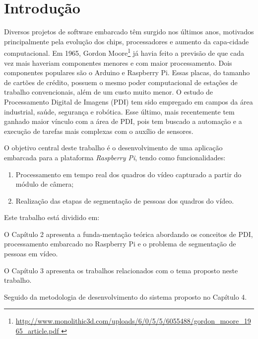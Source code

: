 \documentclass[12pt,oneside,a4paper,chapter=TITLE,section=TITLE,sumario=tradicional]{abntex2}
\begin{document}
\chapter{Introdução}
\label{cap:introducao}

Diversos projetos de software embarcado têm surgido nos últimos anos, motivados principalmente pela evolução dos chips, processadores e aumento da capa-cidade computacional. Em 1965, Gordon Moore\footnote{\url{ http://www.monolithic3d.com/uploads/6/0/5/5/6055488/gordon_moore_1965_article.pdf	
}}  já havia feito a previsão de que cada vez mais haveriam componentes menores e com maior processamento.
Dois componentes populares são o Arduino e Raspberry Pi.  Essas placas, do tamanho de cartões de crédito, possuem o mesmo poder computacional de estações de trabalho convencionais, além de um custo muito menor.   O estudo de Processamento Digital de Imagens (PDI) tem sido empregado em campos da área industrial, saúde, segurança e robótica. Esse último, mais recentemente tem ganhado maior vínculo com a área de PDI, pois tem buscado a automação e a execução de tarefas mais complexas com o auxílio de sensores.

O objetivo central deste trabalho é o desenvolvimento de uma aplicação embarcada para a plataforma \textit{Raspberry Pi}, tendo como funcionalidades:  

\begin{enumerate}
    \item Processamento em tempo real dos quadros do vídeo capturado a partir do módulo de câmera;
    \item Realização das etapas de segmentação de pessoas dos quadros do vídeo.
\end{enumerate}

Este trabalho está dividido em:
\begin{lista}
    \item O Capítulo 2 apresenta a funda-mentação teórica abordando os conceitos de PDI, processamento embarcado no Raspberry Pi e o problema de segmentação de pessoas em vídeo.
    \item O Capítulo 3 apresenta os trabalhos relacionados com o tema proposto neste trabalho.
    \item Seguido da metodologia de desenvolvimento do sistema proposto no Capítulo 4.
\end{lista}
\end{document}
